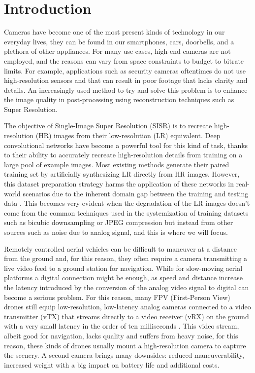 \newpage
\chapter{Introduction}
\label{cha:introduction}

Cameras have become one of the most present kinds of technology in our everyday lives, they can be found in our smartphones, cars, doorbells, and a plethora of other appliances. For many use cases, high-end cameras are not employed, and the reasons can vary from space constraints to budget to bitrate limits. For example, applications such as security cameras oftentimes do not use high-resolution sensors and that can result in poor footage that lacks clarity and details. An increasingly used method to try and solve this problem is to enhance the image quality in post-processing using reconstruction techniques such as Super Resolution.

The objective of Single-Image Super Resolution (SISR) is to recreate high-resolution (HR) images from their low-resolution (LR) equivalent.
Deep convolutional networks have become a powerful tool for this kind of task, thanks to their ability to accurately recreate high-resolution details from training on a large pool of example images.
Most existing methods generate their paired training set by artificially synthesizing LR directly from HR images. However, this dataset preparation strategy harms the application of these networks in real-world scenarios due to the inherent domain gap between the training and testing data \cite{9711325}.
This becomes very evident when the degradation of the LR images doesn't come from the common techniques used in the systemization of training datasets such as bicubic downsampling or JPEG compression but instead from other sources such as noise due to analog signal, and this is where we will focus.

Remotely controlled aerial vehicles can be difficult to maneuver at a distance from the ground and, for this reason, they often require a camera transmitting a live video feed to a ground station for navigation. While for slow-moving aerial platforms a digital connection might be enough, as speed and distance increase the latency introduced by the conversion of the analog video signal to digital can become a serious problem. For this reason, many FPV (First-Person View) drones still equip low-resolution, low-latency analog cameras connected to a video transmitter (vTX) that streams directly to a video receiver (vRX) on the ground with a very small latency in the order of ten milliseconds \cite{oscar}. This video stream, albeit good for navigation, lacks quality and suffers from heavy noise, for this reason, these kinds of drones usually mount a high-resolution camera to capture the scenery. A second camera brings many downsides: reduced maneuverability, increased weight with a big impact on battery life and additional costs.

